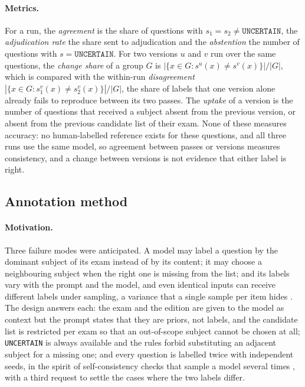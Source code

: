 \paragraph{Metrics.} For a run, the \emph{agreement} is the share of
questions with $s_1=s_2\neq\texttt{UNCERTAIN}$, the \emph{adjudication rate}
the share sent to adjudication and the \emph{abstention} the number of
questions with $s=\texttt{UNCERTAIN}$. For two versions $u$ and $v$ run over
the same questions, the \emph{change share} of a group $G$ is
$|\{x\in G: s^{u}(x)\neq s^{v}(x)\}|/|G|$, which is compared with the
within-run \emph{disagreement} $|\{x\in G: s^{v}_1(x)\neq s^{v}_2(x)\}|/|G|$,
the share of labels that one version alone already fails to reproduce between
its two passes. The \emph{uptake} of a version is the number of questions that
received a subject absent from the previous version, or absent from the
previous candidate list of their exam. None of these measures accuracy: no
human-labelled reference exists for these questions, and all three runs use
the same model, so agreement between passes or versions measures consistency,
and a change between versions is not evidence that either label is right.

\subsection{Annotation method}
\label{app:ka-method}

\paragraph{Motivation.} Three failure modes were anticipated. A model may
label a question by the dominant subject of its exam instead of by its
content; it may choose a neighbouring subject when the right one is missing
from the list; and its labels vary with the prompt and the model, and even
identical inputs can receive different labels under sampling, a variance that
a single sample per item hides \citep{song2025good}. The design answers each: the exam and the edition are given to the
model as context but the prompt states that they are priors, not labels, and
the candidate list is restricted per exam so that an out-of-scope subject
cannot be chosen at all; \texttt{UNCERTAIN} is always available and the rules
forbid substituting an adjacent subject for a missing one; and every question
is labelled twice with independent seeds, in the spirit of self-consistency
checks that sample a model several times \citep{wang2023selfconsistency},
with a third request to settle the cases where the two labels differ.

